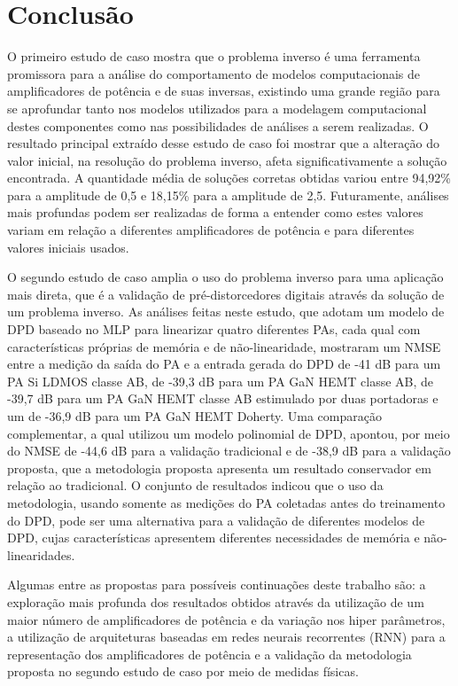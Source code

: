 \chapter{Conclusão} \label{cha:conclusao}
O primeiro estudo de caso mostra que o problema inverso é uma ferramenta promissora para a análise do comportamento de modelos computacionais de amplificadores de potência e de suas inversas, existindo uma grande região para se aprofundar tanto nos modelos utilizados para a modelagem computacional destes componentes como nas possibilidades de análises a serem realizadas. O resultado principal extraído desse estudo de caso foi mostrar que a alteração do valor inicial, na resolução do problema inverso, afeta significativamente a solução encontrada. A quantidade média de soluções corretas obtidas variou entre 94,92\% para a amplitude de 0,5 e 18,15\% para a amplitude de 2,5. Futuramente, análises mais profundas podem ser realizadas de forma a entender como estes valores variam em relação a diferentes amplificadores de potência e para diferentes valores iniciais usados. 

O segundo estudo de caso amplia o uso do problema inverso para uma aplicação mais direta, que é a validação de pré-distorcedores digitais através da solução de um problema inverso. As análises feitas neste estudo, que adotam um modelo de DPD baseado no MLP para linearizar quatro diferentes PAs, cada qual com características próprias de memória e de não-linearidade, mostraram um NMSE entre a medição da saída do PA e a entrada gerada do DPD de -41 dB para um PA Si LDMOS classe AB, de -39,3 dB para um PA GaN HEMT classe AB, de -39,7 dB para um PA GaN HEMT classe AB estimulado por duas portadoras e um de -36,9 dB para um PA GaN HEMT Doherty. Uma comparação complementar, a qual utilizou um modelo polinomial de DPD, apontou, por meio do NMSE de -44,6 dB para a validação tradicional e de -38,9 dB para a validação proposta, que a metodologia proposta apresenta um resultado conservador em relação ao tradicional. O conjunto de resultados indicou que o uso da metodologia, usando somente as medições do PA coletadas antes do treinamento do DPD, pode ser uma alternativa para a validação de diferentes modelos de DPD, cujas características apresentem diferentes necessidades de memória e não-linearidades.

Algumas entre as propostas para possíveis continuações deste trabalho são: a exploração mais profunda dos resultados obtidos através da utilização de um maior número de amplificadores de potência e da variação nos hiper parâmetros, a utilização de arquiteturas baseadas em redes neurais recorrentes (RNN) para a representação dos amplificadores de potência e a validação da metodologia proposta no segundo estudo de caso por meio de medidas físicas.
